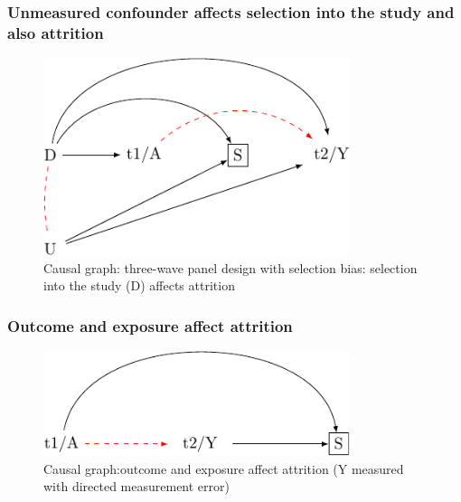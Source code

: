\documentclass[
  singlecolumn]{report}
\begin{document}
\hypertarget{unmeasured-confounder-affects-selection-into-the-study-and-also-attrition}{%
\subsubsection{Unmeasured confounder affects selection into the study
and also
attrition}\label{unmeasured-confounder-affects-selection-into-the-study-and-also-attrition}}

\begin{figure}

{\centering \includegraphics[width=0.8\textwidth,height=\textheight]{causal-dags_files/figure-pdf/fig-dag-8-4-1.pdf}

}

\caption{\label{fig-dag-8-4}Causal graph: three-wave panel design with
selection bias: selection into the study (D) affects attrition}

\end{figure}

\hypertarget{outcome-and-exposure-affect-attrition}{%
\subsubsection{Outcome and exposure affect
attrition}\label{outcome-and-exposure-affect-attrition}}

\begin{figure}

{\centering \includegraphics[width=0.8\textwidth,height=\textheight]{causal-dags_files/figure-pdf/fig-dag-8-5-1.pdf}

}

\caption{\label{fig-dag-8-5}Causal graph:outcome and exposure affect
attrition (Y measured with directed measurement error)}

\end{figure}
\end{document}
